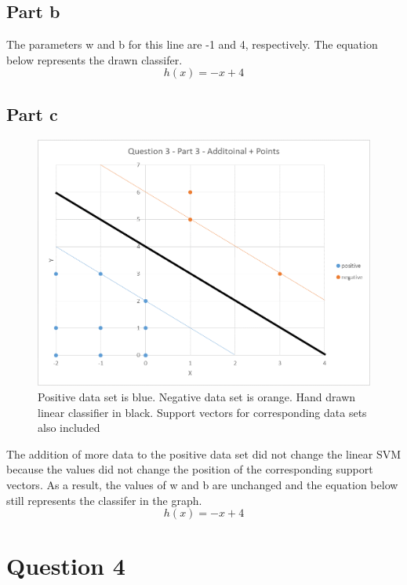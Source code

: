 \documentclass[12pt]{article}
\begin{document}
\subsection*{Part b}
The parameters w and b for this line are -1 and 4, respectively. The equation below represents the drawn classifer.
\begin{equation}
h(x) = -x+4
\end{equation}

\subsection*{Part c}
\begin{figure}[H]
    \centering
    \includegraphics[width=1\textwidth]{question_3_plot_2}
    \caption{Positive data set is blue. Negative data set is orange. Hand drawn linear classifier in black. Support vectors for corresponding data sets also included}
    \label{fig:question_3_plot_2}
\end{figure}
The addition of more data to the positive data set did not change the linear SVM because the values did not change the position of the corresponding support vectors. As a result, the values of w and b are unchanged and the equation below still represents the classifer in the graph.
\begin{equation}
h(x) = -x+4
\end{equation}

\section*{Question 4}
\end{document}
